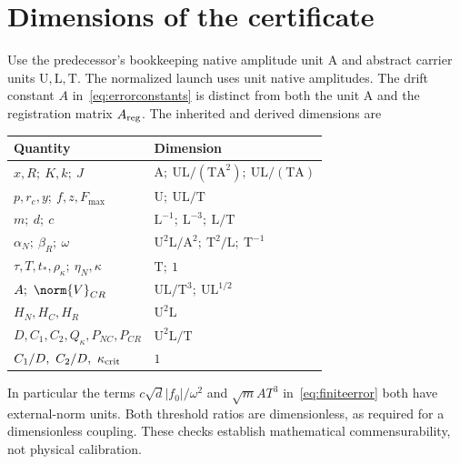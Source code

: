 \section{Dimensions of the certificate}\label{sec:units}
Use the predecessor's bookkeeping native amplitude unit $\mathrm A$ and abstract carrier units $\mathrm U,\mathrm L,\mathrm T$. The normalized launch uses unit native amplitudes. The drift constant $A$ in~\eqref{eq:errorconstants} is distinct from both the unit $\mathrm A$ and the registration matrix $A_{\rm reg}$. The inherited and derived dimensions are
\begin{center}\small
\begin{tabularx}{\textwidth}{@{}P{.45\textwidth}Y@{}}\toprule
Quantity & Dimension\\\midrule
$x,R;\ K,k;\ J$ & $\mathrm A;\ \mathrm U\mathrm L/(\mathrm T\mathrm A^2);\ \mathrm U\mathrm L/(\mathrm T\mathrm A)$\\[3pt]
$p,r_c,y;\ f,z,F_{\max}$ & $\mathrm U;\ \mathrm U\mathrm L/\mathrm T$\\[3pt]
$m;\ d;\ c$ & $\mathrm L^{-1};\ \mathrm L^{-3};\ \mathrm L/\mathrm T$\\[3pt]
$\alpha_N;\ \beta_R;\ \omega$ & $\mathrm U^2\mathrm L/\mathrm A^2;\ \mathrm T^2/\mathrm L;\ \mathrm T^{-1}$\\[3pt]
$\tau,T,t_*,\rho_\kappa;\ \eta_N,\kappa$ & $\mathrm T;\ 1$\\[3pt]
$A;\ \norm{V}_{CR}$ & $\mathrm U\mathrm L/\mathrm T^3;\ \mathrm U\mathrm L^{1/2}$\\[3pt]
$H_N,H_C,H_R$ & $\mathrm U^2\mathrm L$\\[3pt]
$D,C_1,C_2,Q_\kappa,P_{NC},P_{CR}$ & $\mathrm U^2\mathrm L/\mathrm T$\\[3pt]
$C_1/D,\ C_2/D,\ \kappa_{\rm crit}$ & $1$\\\bottomrule
\end{tabularx}
\end{center}
In particular the terms $c\sqrt d|f_0|/\omega^2$ and
$\sqrt m AT^3$ in~\eqref{eq:finiteerror} both have external-norm units. Both threshold ratios are dimensionless, as required for a dimensionless coupling. These checks establish mathematical commensurability, not physical calibration.
